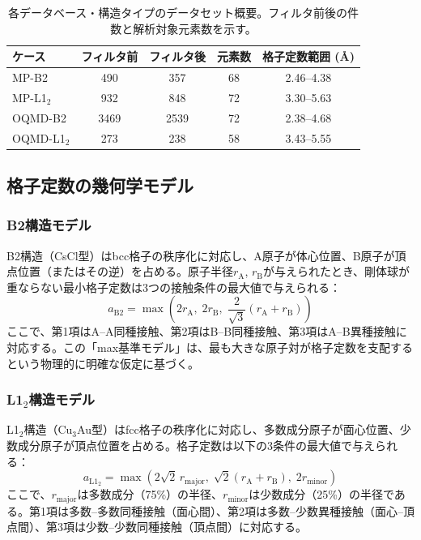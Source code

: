 \documentclass[a4paper,10pt,5p]{elsarticle}
\begin{document}
\begin{table}[htbp]
\small
    \centering
    \caption{各データベース・構造タイプのデータセット概要。フィルタ前後の件数と解析対象元素数を示す。}
    \label{tab:combined_data}
    \begin{tabular}{lcccc}
        \toprule
        ケース & フィルタ前 & フィルタ後 & 元素数 & 格子定数範囲 (\AA) \\
        \midrule
        MP-B2 & 490 & 357 & 68 & 2.46--4.38 \\
        MP-L1$_2$ & 932 & 848 & 72 & 3.30--5.63 \\
        OQMD-B2 & 3469 & 2539 & 72 & 2.38--4.68 \\
        OQMD-L1$_2$ & 273 & 238 & 58 & 3.43--5.55 \\
        \bottomrule
    \end{tabular}
\end{table}


\subsection{格子定数の幾何学モデル}

\subsubsection{B2構造モデル}
B2構造（CsCl型）はbcc格子の秩序化に対応し、A原子が体心位置、B原子が頂点位置（またはその逆）を占める。原子半径$r_\mathrm{A}$, $r_\mathrm{B}$が与えられたとき、剛体球が重ならない最小格子定数は3つの接触条件の最大値で与えられる：
\begin{equation}
    a_\mathrm{B2} = \max\left(2r_\mathrm{A},\; 2r_\mathrm{B},\; \frac{2}{\sqrt{3}}(r_\mathrm{A} + r_\mathrm{B})\right)
    \label{eq:B2}
\end{equation}
ここで、第1項はA--A同種接触、第2項はB--B同種接触、第3項はA--B異種接触に対応する。この「max基準モデル」は、最も大きな原子対が格子定数を支配するという物理的に明確な仮定に基づく。

\subsubsection{L1$_2$構造モデル}
L1$_2$構造（Cu$_3$Au型）はfcc格子の秩序化に対応し、多数成分原子が面心位置、少数成分原子が頂点位置を占める。格子定数は以下の3条件の最大値で与えられる：
\begin{equation}
    a_\mathrm{L1_2} = \max\left(2\sqrt{2}\,r_\mathrm{major},\; \sqrt{2}(r_\mathrm{A} + r_\mathrm{B}),\; 2r_\mathrm{minor}\right)
    \label{eq:L12}
\end{equation}
ここで、$r_\mathrm{major}$は多数成分（75\%）の半径、$r_\mathrm{minor}$は少数成分（25\%）の半径である。第1項は多数--多数同種接触（面心間）、第2項は多数--少数異種接触（面心--頂点間）、第3項は少数--少数同種接触（頂点間）に対応する。
\end{document}

